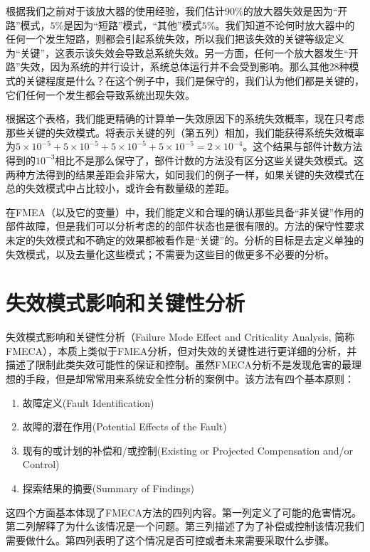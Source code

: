 \documentclass[cn,11pt,chinese]{elegantbook}
\begin{document}
根据我们之前对于该放大器的使用经验，我们估计$90\%$的放大器失效是因为“开路”模式，$5\%$是因为“短路”模式，“其他”模式$5\%$。我们知道不论何时放大器中的任何一个发生短路，则都会引起系统失效，所以我们把该失效的关键等级定义为“关键”，这表示该失效会导致总系统失效。另一方面，任何一个放大器发生“开路”失效，因为系统的并行设计，系统总体运行并不会受到影响。那么其他28种模式的关键程度是什么？在这个例子中，我们是保守的，我们认为他们都是关键的，它们任何一个发生都会导致系统出现失效。


根据这个表格，我们能更精确的计算单一失效原因下的系统失效概率，现在只考虑那些关键的失效模式。将表示关键的列（第五列）相加，我们能获得系统失效概率为$5 \times 10^{-5}+ 5 \times 10^{-5}+ 5 \times 10^{-5}+ 5 \times 10^{-5}=2 \times 10^{-4}$。这个结果与部件计数方法得到的$10^{-3}$相比不是那么保守了，部件计数的方法没有区分这些关键失效模式。这两种方法得到的结果差距会非常大，如同我们的例子一样，如果关键的失效模式在总的失效模式中占比较小，或许会有数量级的差距。

在FMEA（以及它的变量）中，我们能定义和合理的确认那些具备“非关键”作用的部件故障，但是我们可以分析考虑的的部件状态也是很有限的。方法的保守性要求未定的失效模式和不确定的效果都被看作是“关键”的。分析的目标是去定义单独的失效模式，以及去量化这些模式；不需要为这些目的做更多不必要的分析。

\section{失效模式影响和关键性分析}

失效模式影响和关键性分析（Failure Mode Effect and Criticality Analysis, 简称FMECA），本质上类似于FMEA分析，但对失效的关键性进行更详细的分析，并描述了限制此类失效可能性的保证和控制。虽然FMECA分析不是发现危害的最理想的手段，但是却常常用来系统安全性分析的案例中。该方法有四个基本原则：

\begin{enumerate}
	\item 故障定义(Fault Identification)
	\item 故障的潜在作用(Potential Effects of the Fault)
	\item 现有的或计划的补偿和/或控制(Existing or Projected Compensation and/or Control)
	\item 探索结果的摘要(Summary of Findings)
\end{enumerate}

这四个方面基本体现了FMECA方法的四列内容。第一列定义了可能的危害情况。第二列解释了为什么该情况是一个问题。第三列描述了为了补偿或控制该情况我们需要做什么。第四列表明了这个情况是否可控或者未来需要采取什么步骤。
\end{document}
